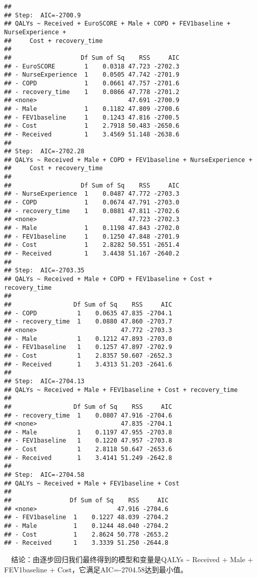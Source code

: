 \documentclass[
]{article}
\begin{document}
\begin{verbatim}
## 
## Step:  AIC=-2700.9
## QALYs ~ Received + EuroSCORE + Male + COPD + FEV1baseline + NurseExperience + 
##     Cost + recovery_time
## 
##                   Df Sum of Sq    RSS     AIC
## - EuroSCORE        1    0.0318 47.723 -2702.3
## - NurseExperience  1    0.0505 47.742 -2701.9
## - COPD             1    0.0661 47.757 -2701.6
## - recovery_time    1    0.0866 47.778 -2701.2
## <none>                         47.691 -2700.9
## - Male             1    0.1182 47.809 -2700.6
## - FEV1baseline     1    0.1243 47.816 -2700.5
## - Cost             1    2.7918 50.483 -2650.6
## - Received         1    3.4569 51.148 -2638.6
## 
## Step:  AIC=-2702.28
## QALYs ~ Received + Male + COPD + FEV1baseline + NurseExperience + 
##     Cost + recovery_time
## 
##                   Df Sum of Sq    RSS     AIC
## - NurseExperience  1    0.0487 47.772 -2703.3
## - COPD             1    0.0674 47.791 -2703.0
## - recovery_time    1    0.0881 47.811 -2702.6
## <none>                         47.723 -2702.3
## - Male             1    0.1198 47.843 -2702.0
## - FEV1baseline     1    0.1250 47.848 -2701.9
## - Cost             1    2.8282 50.551 -2651.4
## - Received         1    3.4438 51.167 -2640.2
## 
## Step:  AIC=-2703.35
## QALYs ~ Received + Male + COPD + FEV1baseline + Cost + recovery_time
## 
##                 Df Sum of Sq    RSS     AIC
## - COPD           1    0.0635 47.835 -2704.1
## - recovery_time  1    0.0880 47.860 -2703.7
## <none>                       47.772 -2703.3
## - Male           1    0.1212 47.893 -2703.0
## - FEV1baseline   1    0.1257 47.897 -2702.9
## - Cost           1    2.8357 50.607 -2652.3
## - Received       1    3.4313 51.203 -2641.6
## 
## Step:  AIC=-2704.13
## QALYs ~ Received + Male + FEV1baseline + Cost + recovery_time
## 
##                 Df Sum of Sq    RSS     AIC
## - recovery_time  1    0.0807 47.916 -2704.6
## <none>                       47.835 -2704.1
## - Male           1    0.1197 47.955 -2703.8
## - FEV1baseline   1    0.1220 47.957 -2703.8
## - Cost           1    2.8118 50.647 -2653.6
## - Received       1    3.4141 51.249 -2642.8
## 
## Step:  AIC=-2704.58
## QALYs ~ Received + Male + FEV1baseline + Cost
## 
##                Df Sum of Sq    RSS     AIC
## <none>                      47.916 -2704.6
## - FEV1baseline  1    0.1227 48.039 -2704.2
## - Male          1    0.1244 48.040 -2704.2
## - Cost          1    2.8624 50.778 -2653.2
## - Received      1    3.3339 51.250 -2644.8
\end{verbatim}

 结论：由逐步回归我们最终得到的模型和变量是QALYs \textasciitilde{}
Received + Male + FEV1baseline + Cost，它满足AIC=-2704.58达到最小值。
\end{document}
